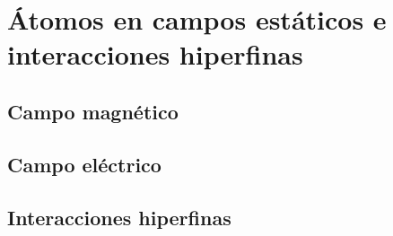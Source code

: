 \chapter{Átomos en campos estáticos e interacciones hiperfinas} \label{Ch:02}

\section{Campo magnético}

\section{Campo eléctrico}

\section{Interacciones hiperfinas}

